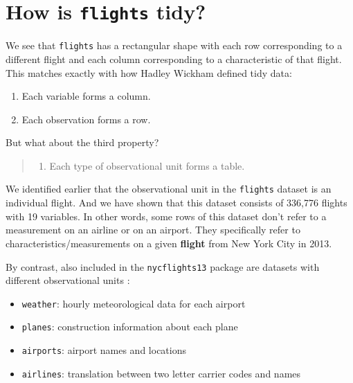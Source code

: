 \documentclass[]{tufte-book}
\providecommand{\tightlist}{%
  \setlength{\itemsep}{0pt}\setlength{\parskip}{0pt}}
\begin{document}
\section{\texorpdfstring{How is \texttt{flights}
tidy?}{How is flights tidy?}}\label{how-is-flights-tidy}

We see that \texttt{flights} has a rectangular shape with each row
corresponding to a different flight and each column corresponding to a
characteristic of that flight. This matches exactly with how Hadley
Wickham defined tidy data:

\begin{enumerate}
\def\labelenumi{\arabic{enumi}.}
\tightlist
\item
  Each variable forms a column.
\item
  Each observation forms a row.
\end{enumerate}

But what about the third property?

\begin{quote}
\begin{enumerate}
\def\labelenumi{\arabic{enumi}.}
\setcounter{enumi}{2}
\tightlist
\item
  Each type of observational unit forms a table.
\end{enumerate}
\end{quote}

We identified earlier that the observational unit in the
\texttt{flights} dataset is an individual flight. And we have shown that
this dataset consists of 336,776 flights with 19 variables. In other
words, some rows of this dataset don't refer to a measurement on an
airline or on an airport. They specifically refer to
characteristics/measurements on a given \textbf{flight} from New York
City in 2013.

By contrast, also included in the \texttt{nycflights13} package are
datasets with different observational units \citep{R-nycflights13}:

\begin{itemize}
\tightlist
\item
  \texttt{weather}: hourly meteorological data for each airport
\item
  \texttt{planes}: construction information about each plane
\item
  \texttt{airports}: airport names and locations
\item
  \texttt{airlines}: translation between two letter carrier codes and
  names
\end{itemize}
\end{document}
